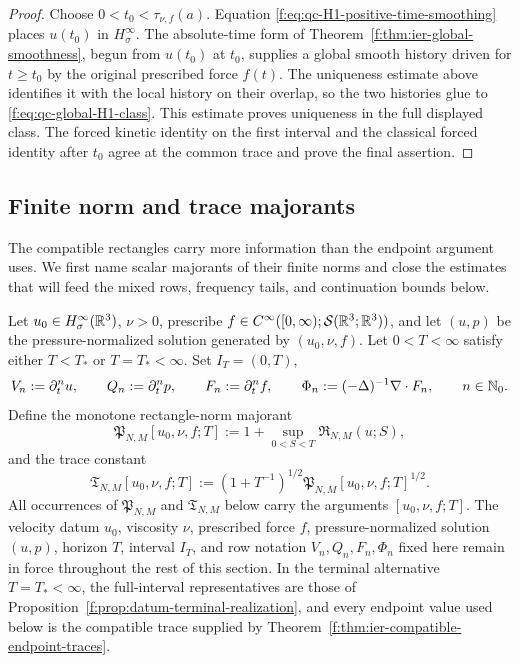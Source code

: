 \begin{proof}
Choose \(0<t_0<\tau_{\nu,f}(a)\).  Equation
\eqref{f:eq:qc-H1-positive-time-smoothing} places \(u(t_0)\) in
\(H^\infty_\sigma\).  The absolute-time form of
Theorem~\ref{f:thm:ier-global-smoothness}, begun from \(u(t_0)\) at \(t_0\),
supplies a global smooth history driven for \(t\ge t_0\) by the original
prescribed force \(f(t)\).  The
uniqueness estimate above identifies it with the local history on their
overlap, so the two histories glue to \eqref{f:eq:qc-global-H1-class}.
This estimate proves uniqueness in the full displayed class.  The forced
kinetic identity on the first interval and the classical forced identity
after \(t_0\) agree
at the common trace and prove the final assertion.
\end{proof}

\subsection{Finite norm and trace majorants}

The compatible rectangles carry more information than the endpoint argument
uses.  We first name scalar majorants of their finite norms and close the estimates that will
feed the mixed rows, frequency tails, and continuation bounds below.

\begin{definition}
\label{f:def:qc-producer-constants}
Let \(u_0\in H^\infty_\sigma(\mathbb R^3)\), \(\nu>0\), prescribe
\(f\in C^\infty([0,\infty);\mathcal S(\mathbb R^3;\mathbb R^3))\), and let \((u,p)\) be
the pressure-normalized solution generated by \((u_0,\nu,f)\).  Let
\(0<T<\infty\) satisfy
either \(T<T_*\) or \(T=T_*<\infty\).  Set
\(I_T=(0,T)\),
\[
 V_n:=\partial_t^n u,
 \qquad
 Q_n:=\partial_t^n p,
 \qquad
 F_n:=\partial_t^n f,
 \qquad
 \Phi_n:=(-\Delta)^{-1}\nabla\cdot F_n,
 \qquad n\in\mathbb N_0.
\]
Define the monotone rectangle-norm majorant
\begin{equation}
 \mathfrak P_{N,M}[u_0,\nu,f;T]
 :=1+\sup_{0<S<T}\mathfrak R_{N,M}(u;S),
 \label{f:eq:qc-producer-constant}
\end{equation}
and the trace constant
\begin{equation}
 \mathfrak T_{N,M}[u_0,\nu,f;T]
 :=\left(1+T^{-1}\right)^{1/2}
   \mathfrak P_{N,M}[u_0,\nu,f;T]^{1/2}.
 \label{f:eq:qc-trace-constant}
\end{equation}
All occurrences of \(\mathfrak P_{N,M}\) and \(\mathfrak T_{N,M}\) below
carry the arguments \([u_0,\nu,f;T]\).
The velocity datum \(u_0\), viscosity \(\nu\), prescribed force \(f\),
pressure-normalized solution \((u,p)\), horizon \(T\), interval \(I_T\),
and row notation \(V_n,Q_n,F_n,\Phi_n\) fixed here remain in force
throughout the rest of this section.
In the terminal alternative \(T=T_*<\infty\), the full-interval representatives
are those of
Proposition~\ref{f:prop:datum-terminal-realization}, and every endpoint value
used below is the compatible trace supplied by
Theorem~\ref{f:thm:ier-compatible-endpoint-traces}.
\end{definition}

